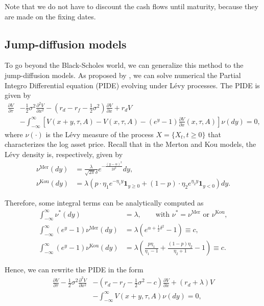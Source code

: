 Note that we do not have to discount the cash flows until maturity, because they are made on the fixing dates.

\subsection{Jump-diffusion models}
To go beyond the Black-Scholes world, we can generalize this method to the jump-diffusion models. As proposed by \citeauthor{CV05} \citeyearpar{CV05} \cite{CV05}, we can solve numerical the Partial Integro Differential equation (PIDE) evolving under L\'evy processes. The PIDE is given by
\begin{align*}\frac{\partial V}{\partial \tau}&-\frac{1}{2}\sigma^2\frac{\partial^2V}{\partial x^2}-\left(r_d-r_f-\frac{1}{2}\sigma^2\right)\frac{\partial V}{\partial x}+r_d V \\
&-\int_{-\infty}^\infty \left[V(x+y,\tau,A)-V(x,\tau,A)-\left(e^y-1\right)\frac{\partial V}{\partial x}(x,\tau,A)\right]\nu(dy) = 0,
\end{align*}
where $\nu(\cdot)$ is the L\'evy measure of the process $X =\{X_t,t\geq0\}$ that characterizes the log asset price. Recall that in the Merton and Kou models, the L\'evy density is, respectively, given by
\begin{align*}
\nu^\text{Mer}(dy) &= \frac{\lambda}{\sqrt{2\pi}\delta}e^{-\frac{(y-\alpha)^2}{2\delta^2}}dy,\\
\nu^\text{Kou}(dy) &= \lambda\left(p\cdot\eta_1e^{-\eta_1 y} \mathbf{1}_{y\geq0}+(1-p)\cdot\eta_2e^{\eta_2y}\mathbf{1}_{y<0}\right)dy.
\end{align*}

Therefore, some integral terms can be analytically computed as
\begin{align*}
\int_{-\infty}^\infty \nu^\ast(dy) &= \lambda, \qquad \text{with } \nu^\ast = \nu^\text{Mer} \text{ or } \nu^\text{Kou},\\
\int_{-\infty}^\infty (e^y-1)\nu^\text{Mer}(dy) &= \lambda\left(e^{\alpha +\frac{1}{2}\delta^2}-1\right)\equiv c,\\
\int_{-\infty}^\infty (e^y-1)\nu^\text{Kou}(dy) &= \lambda\left(\frac{p\eta_1}{\eta_1-1}+\frac{(1-p)\eta_2}{\eta_2+1}-1\right)\equiv c.
\end{align*}

Hence, we can rewrite the PIDE in the form
\begin{align*}\frac{\partial V}{\partial \tau}-\frac{1}{2}\sigma^2\frac{\partial^2V}{\partial x^2}&-\left(r_d-r_f-\frac{1}{2}\sigma^2 -c\right)\frac{\partial V}{\partial x}+(r_d +\lambda)V \\
&-\int_{-\infty}^\infty V(x+y,\tau,A)\nu(dy) = 0,
\end{align*}

